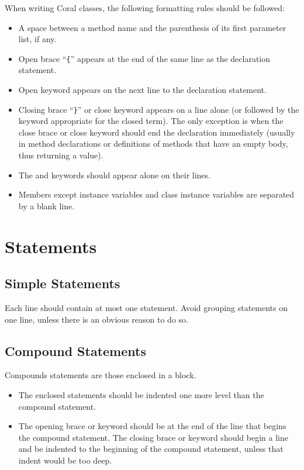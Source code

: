 When writing Coral classes, the following formatting rules should be followed: 
\begin{itemize}
\item A space between a method name and the parenthesis of its first parameter list, if any. 
\item Open brace ``\lstinline!{!'' appears at the end of the same line as the declaration statement. 
\item Open keyword  appears on the next line to the declaration statement. 
\item Closing brace ``\lstinline!}!'' or close keyword  appears on a line alone (or followed by the keyword appropriate for the closed term). The only exception is when the close brace or close keyword should end the declaration immediately (usually in method declarations or definitions of methods that have an empty body, thus returning a  value). 
\item The  and  keywords should appear alone on their lines. 
\item Members except instance variables and class instance variables are separated by a blank line. 
\end{itemize}





\section{Statements}






\subsection{Simple Statements}

Each line should contain at most one statement. Avoid grouping statements on one line, unless there is an obvious reason to do so. 





\subsection{Compound Statements}

Compounds statements are those enclosed in a block. 
\begin{itemize}
\item The enclosed statements should be indented one more level than the compound statement. 
\item The opening brace or keyword should be at the end of the line that begins the compound statement. The closing brace or keyword should begin a line and be indented to the beginning of the compound statement, unless that indent would be too deep. 
\end{itemize}





